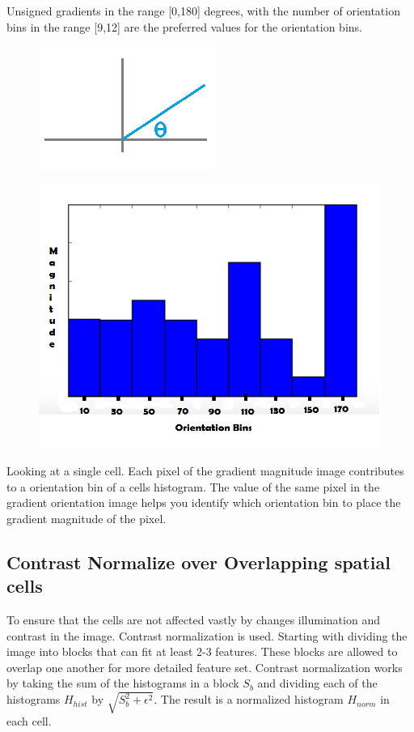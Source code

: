 Unsigned gradients in the range [0,180] degrees, with the number of orientation bins in the range [9,12] are the preferred values for the orientation bins.
\begin{figure}[H]
\centering
\begin{minipage}{.5\textwidth}
  \centering
  \includegraphics[width=.4\linewidth]{theta}
  \label{fig:test1}
\end{minipage}%
\begin{minipage}{.5\textwidth}
  \centering
  \includegraphics[width=.4\linewidth]{hist}
  \label{fig:test2}
\end{minipage}
\end{figure}
Looking at a single cell. Each pixel of the gradient magnitude image contributes to a orientation bin of a cells histogram. The value of the same pixel in the gradient orientation image helps you identify which orientation bin to place the gradient magnitude of the pixel.

\subsection{Contrast Normalize over Overlapping spatial cells}
To ensure that the cells are not affected vastly by changes illumination and contrast in the image. Contrast normalization is used. Starting with dividing the image into blocks that can fit at least 2-3 features. These blocks are allowed to overlap one another for more detailed feature set. Contrast normalization works by taking the sum of the histograms in a block $S_b$ and dividing each of the histograms $H_{hist}$ by $\sqrt{S_b ^2 + \epsilon ^2}$. The result is a normalized histogram $H_{norm}$ in each cell. 

